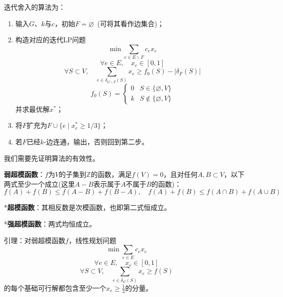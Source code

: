 \documentclass[a4paper,UTF8,fontset=windows]{ctexart}
\begin{document}
迭代舍入的算法为：
\begin{enumerate}
    \item 输入$G$、$k$与$c$，初始$F=\varnothing$\ (可将其看作边集合)；
    \item 构造对应的迭代LP问题
    $$\min\sum_{e\in E\backslash F}c_ex_e$$
    $$\forall e\in E,\quad x_e\in[0,1]$$
    $$\forall S\subset V,\quad\sum_{e\in\delta_{G\backslash F}(S)}x_e\ge f_0(S)-|\delta_F(S)|$$
    $$f_0(S)=\begin{cases}0&S\in\{\varnothing,V\}\\k&S\notin\{\varnothing,V\}\end{cases}$$
    并求最优解$x^*$；
    \item 将$F$扩充为$F\cup\{e\mid x_e^*\ge 1/3\}$；
    \item 若$F$已经$k$-边连通，输出，否则回到第二步。
\end{enumerate}

我们需要先证明算法的有效性。

\textbf{弱超模函数}：$f$为$V$的子集到$\mathbb{Z}$的函数，满足$f(V)=0$，且对任何$A,B\subset V$，以下两式至少一个成立(这里$A-B$表示属于$A$不属于$B$的函数)：
$$f(A)+f(B)\le f(A-B)+f(B-A),\quad f(A)+f(B)\le f(A\cap B)+f(A\cup B)$$

*\textbf{超模函数}：其相反数是次模函数，也即第二式恒成立。

*\textbf{强超模函数}：两式均恒成立。

引理：对弱超模函数$f$，线性规划问题
$$\min\sum_{e\in E}c_ex_e$$
$$\forall e\in E,\quad x_e\in[0,1]$$
$$\forall S\subset V,\quad\sum_{e\in\delta_G(S)}x_e\ge f(S)$$
的每个基础可行解都包含至少一个$x_e\ge\frac{1}{3}$的分量。
\end{document}
